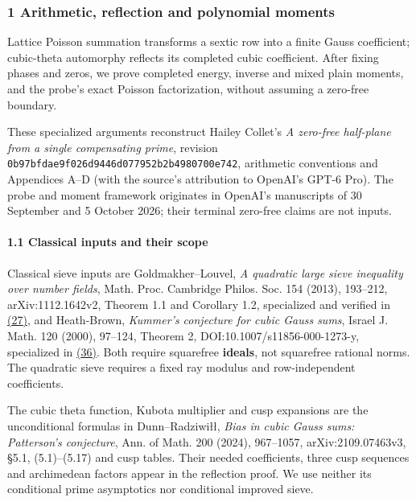 \hypertarget{arithmetic-reflection-and-polynomial-moments}{%
\subsubsection{1 Arithmetic, reflection and polynomial moments}\label{arithmetic-reflection-and-polynomial-moments}}

Lattice Poisson summation transforms a sextic row into a finite Gauss coefficient; cubic-theta automorphy reflects its completed cubic coefficient. After fixing phases and zeros, we prove completed energy, inverse and mixed plain moments, and the probe's exact Poisson factorization, without assuming a zero-free boundary.

These specialized arguments reconstruct Hailey Collet's \emph{A zero-free half-plane from a single compensating prime}, revision \texttt{0b97bfda\allowbreak{}e9f026d9\allowbreak{}446d0779\allowbreak{}52b2b498\allowbreak{}0700e742}, arithmetic conventions and Appendices A--D (with the source's attribution to OpenAI's GPT-6 Pro). The probe and moment framework originates in OpenAI's manuscripts of 30 September and 5 October 2026; their terminal zero-free claims are not inputs.

\hypertarget{cf:classical-inputs}{}

\label{cf:classical-inputs}

\hypertarget{classical-inputs-and-their-scope}{%
\paragraph{1.1 Classical inputs and their scope}\label{classical-inputs-and-their-scope}}

Classical sieve inputs are Goldmakher--Louvel, \emph{A quadratic large sieve inequality over number fields}, Math. Proc. Cambridge Philos. Soc. 154 (2013), 193--212, arXiv:1112.1642v2, Theorem 1.1 and Corollary 1.2, specialized and verified in \protect\hyperlink{cf:eq:B.11}{(27)}, and Heath-Brown, \emph{Kummer's conjecture for cubic Gauss sums}, Israel J. Math. 120 (2000), 97--124, Theorem 2, DOI:10.1007/s11856-000-1273-y, specialized in \protect\hyperlink{cf:eq:B.19}{(36)}. Both require squarefree \textbf{ideals}, not squarefree rational norms. The quadratic sieve requires a fixed ray modulus and row-independent coefficients.

The cubic theta function, Kubota multiplier and cusp expansions are the unconditional formulas in Dunn--Radziwi\l{}\l{}, \emph{Bias in cubic Gauss sums: Patterson's conjecture}, Ann. of Math. 200 (2024), 967--1057, arXiv:2109.07463v3, §5.1, (5.1)--(5.17) and cusp tables. Their needed coefficients, three cusp sequences and archimedean factors appear in the reflection proof. We use neither its conditional prime asymptotics nor conditional improved sieve.

